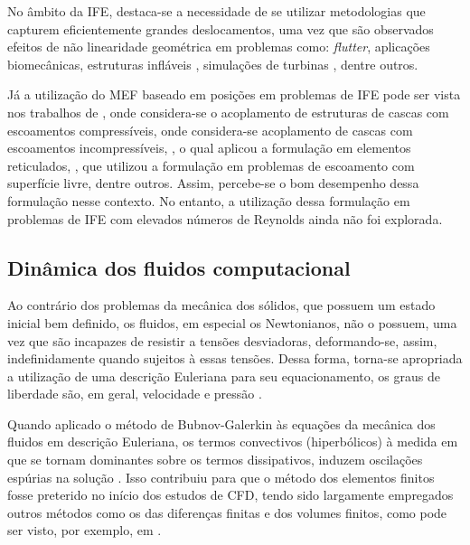 No âmbito da IFE, destaca-se a necessidade de se utilizar metodologias que capturem eficientemente grandes deslocamentos, uma vez que são observados efeitos de não linearidade geométrica em problemas como: \textit{flutter}, aplicações biomecânicas, estruturas infláveis \cite{karagiozis2011computational}, simulações de turbinas \cite{bazilevs20113d}, dentre outros.

Já a utilização do MEF baseado em posições em problemas de IFE pode ser vista nos trabalhos de , onde considera-se o acoplamento de estruturas de cascas com escoamentos compressíveis,  onde considera-se acoplamento de cascas com escoamentos incompressíveis, , o qual aplicou a formulação em elementos reticulados, , que utilizou a formulação em problemas de escoamento com superfície livre, dentre outros. Assim, percebe-se o bom desempenho dessa formulação nesse contexto. No entanto, a utilização dessa formulação em problemas de IFE com elevados números de Reynolds ainda não foi explorada.


\subsection{Dinâmica dos fluidos computacional} \label{CFD}

Ao contrário dos problemas da mecânica dos sólidos, que possuem um estado inicial bem definido, os fluidos, em especial os Newtonianos, não o possuem, uma vez que são incapazes de resistir a tensões desviadoras, deformando-se, assim, indefinidamente quando sujeitos à essas tensões. Dessa forma, torna-se apropriada a utilização de uma descrição Euleriana para seu equacionamento, os graus de liberdade são, em geral, velocidade e pressão \cite{fernandes2020tecnica}.

Quando aplicado o método de Bubnov-Galerkin às equações da mecânica dos fluidos em descrição Euleriana, os termos convectivos (hiperbólicos) à medida em que se tornam dominantes sobre os termos dissipativos, induzem oscilações espúrias na solução \cite{bazilevs2013computational,brooks1982streamline}. Isso contribuiu para que o método dos elementos finitos fosse preterido no início dos estudos de CFD, tendo sido largamente empregados outros métodos como os das diferenças finitas e dos volumes finitos, como pode ser visto, por exemplo, em .

